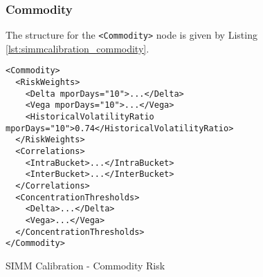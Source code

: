 \subsubsection{Commodity}
The structure for the {\tt <Commodity>} node is given by Listing \ref{lst:simmcalibration_commodity}.

\begin{listing}[H]
\begin{verbatim}
<Commodity>
  <RiskWeights>
    <Delta mporDays="10">...</Delta>
    <Vega mporDays="10">...</Vega>
    <HistoricalVolatilityRatio mporDays="10">0.74</HistoricalVolatilityRatio>
  </RiskWeights>
  <Correlations>
    <IntraBucket>...</IntraBucket>
    <InterBucket>...</InterBucket>
  </Correlations>
  <ConcentrationThresholds>
    <Delta>...</Delta>
    <Vega>...</Vega>
  </ConcentrationThresholds>
</Commodity>
\end{verbatim}
\caption{SIMM Calibration - Commodity Risk}
\label{lst:simmcalibration_commodity}
\end{listing}

